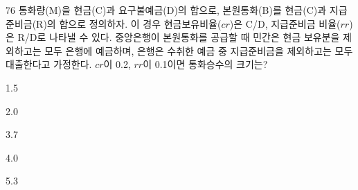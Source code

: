 \begin{question}{76}
통화량(M)을 현금(C)과 요구불예금(D)의 합으로, 본원통화(B)를 현금(C)과 지급준비금(R)의 합으로 정의하자. 이 경우 현금보유비율($cr$)은 C/D, 지급준비금 비율($rr$)은 R/D로 나타낼 수 있다. 중앙은행이 본원통화를 공급할 때 민간은 현금 보유분을 제외하고는 모두 은행에 예금하며, 은행은 수취한 예금 중 지급준비금을 제외하고는 모두 대출한다고 가정한다. $cr$이 0.2, $rr$이 0.1이면 통화승수의 크기는?
\begin{choices}
  \item 1.5
  \item 2.0
  \item 3.7
  \item 4.0
  \item 5.3
\end{choices}
\end{question}
